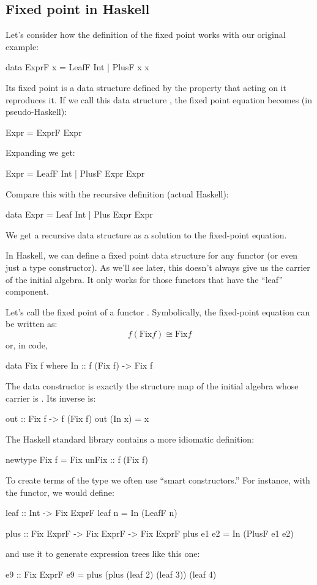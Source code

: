 \documentclass[DaoFP]{subfiles}
\begin{document}
\subsection{Fixed point in Haskell}
Let's consider how the definition of the fixed point works with our original example:
\begin{haskell}
data ExprF x = LeafF Int | PlusF x x
\end{haskell}
Its fixed point is a data structure defined by the property that  acting on it reproduces it. If we call this data structure , the fixed point equation becomes  (in pseudo-Haskell):
\begin{haskell}
Expr = ExprF Expr
\end{haskell}
Expanding  we get:
\begin{haskell}
Expr = LeafF Int | PlusF Expr Expr
\end{haskell}
Compare this with the recursive definition (actual Haskell):
\begin{haskell}
data Expr = Leaf Int | Plus Expr Expr
\end{haskell}
We get a recursive data structure as a solution to the fixed-point equation.

In Haskell, we can define a fixed point data structure for any functor (or even just a type constructor). As we'll see later, this doesn't always give us the carrier of the initial algebra. It only works for those functors that have the ``leaf'' component.

Let's call  the fixed point of a functor . Symbolically, the fixed-point equation can be written as:
\[f ( \text{Fix} f) \cong  \text{Fix} f \]
or, in code,
\begin{haskell}
data Fix f where
  In :: f (Fix f) -> Fix f
\end{haskell}
The data constructor  is exactly the structure map of the initial algebra whose carrier is . Its inverse is:
\begin{haskell}
out :: Fix f -> f (Fix f)
out (In x) = x
\end{haskell}
The Haskell standard library contains a more idiomatic definition:
\begin{haskell}
newtype Fix f = Fix { unFix :: f (Fix f) }
\end{haskell}

To create terms of the type  we often use ``smart constructors.'' For instance, with the  functor, we would define:
\begin{haskell}
leaf :: Int -> Fix ExprF
leaf n = In (LeafF n)

plus :: Fix ExprF -> Fix ExprF -> Fix ExprF
plus e1 e2 = In (PlusF e1 e2)
\end{haskell}
and use it to generate expression trees like this one:
\begin{haskell}
e9 :: Fix ExprF
e9 = plus (plus (leaf 2) (leaf 3)) (leaf 4)
\end{haskell}
\end{document}
